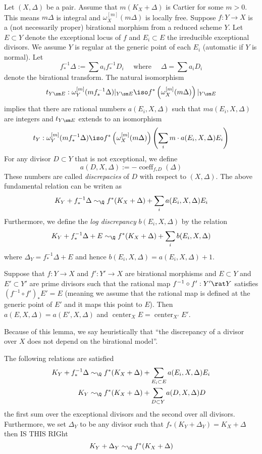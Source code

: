\documentclass[12pt]{article}
\DeclareMathOperator{\coeff}{\mathrm{coeff}}
\DeclareMathOperator{\cent}{\mathrm{center}}
\begin{document}
\begin{defn}
Let $(X, \Delta)$ be a pair. Assume that $m (K_X + \Delta)$ is Cartier for some $m > 0$. This means $m \Delta$ is integral and $\omega_X^{[m]}(m \Delta)$ is locally free. Suppose $f : Y \to X$ is a (not necessarily proper) birational morphism from a reduced scheme $Y$. Let $E \subset Y$ denote the exceptional locus of $f$ and $E_i \subset E$ the irreducible exceptional divisors. We assume $Y$ is regular at the generic point of each $E_i$ (automatic if $Y$ is normal). Let 
\[ f_*^{-1} \Delta := \sum a_i f_*^{-1} D_i \quad \text{ where } \quad \Delta = \sum a_i D_i \]
denote the birational transform. The natural isomorphism
\[ t_{Y \sm E} : \omega_Y^{[m]}(m f_*^{-1} \Delta)|_{Y \sm E} \iso f^* \left( \omega_X^{[m]}(m \Delta) \right) |_{Y \sm E} \]
implies that there are rational numbers $a(E_i, X, \Delta)$ such that $m a(E_i, X, \Delta)$ are integers and $t_{Y \sm E}$ extends to an isomorphism
\[ t_Y : \omega_Y^{[m]}(m f_*^{-1} \Delta) \iso f^* \left( \omega_X^{[m]}(m \Delta) \right) \left( \sum_i m \cdot a(E_i, X, \Delta) E_i \right) \]
For any divisor $D \subset Y$ that is not exceptional, we define 
\[ a(D, X, \Delta) := - \coeff_{f_* D}(\Delta) \]
These numbers are called \textit{discrepacies} of $D$ with respect to $(X, \Delta)$. The above fundamental relation can be writen as
\[ K_Y + f_*^{-1} \Delta \sim_{\Q} f^* (K_X + \Delta) + \sum_i a(E_i, X, \Delta) E_i \]
Furthermore, we define the \textit{log discrepancy} $b(E_i, X, \Delta)$ by the relation
\[ K_Y + f_*^{-1} \Delta + E \sim_{\Q} f^* (K_X + \Delta
) + \sum_i b(E_i, X, \Delta) \]
where $\Delta_Y = f_*^{-1} \Delta + E$ and hence $b(E_i, X, \Delta) = a(E_i, X, \Delta) + 1$.
\end{defn}

\begin{lemma}
Suppose that $f : Y \to X$ and $f' : Y' \to X$ are birational morphisms and $E \subset Y$ and $E' \subset Y'$ are prime divisors such that the rational map $f^{-1} \circ f' : Y' \rat Y$ satisfies $(f^{-1} \circ f')_* E' = E$ (meaning we assume that the rational map is defined at the generic point of $E'$ and it maps this point to $E$). Then $a(E, X, \Delta) = a(E', X, \Delta)$ and $\cent_X E = \cent_{X'} E'$.
\end{lemma}

\begin{rmk}
Because of this lemma, we say heuristically that ``the discrepancy of a divisor over $X$ does not depend on the birational model''. 
\end{rmk}
\begin{rmk}
The following relations are satisfied
\begin{align*}
K_Y + f_*^{-1} \Delta & \sim_{\Q} f^* (K_X + \Delta) + \sum_{E_i \subset E} a(E_i, X, \Delta) E_i
\\
K_Y  & \sim_{\Q} f^* (K_X + \Delta) + \sum_{D \subset Y} a(D, X, \Delta) D
\end{align*}
the first sum over the exceptional divisors and the second over all divisors. Furthermore, we set $\Delta_Y$ to be any divisor such that $f_* (K_Y + \Delta_Y) = K_X + \Delta$ then {\color{red} IS THIS RIGht}
\[ K_Y + \Delta_Y \sim_{\Q} f^* (K_X + \Delta) \]
\end{rmk}
\end{document}
